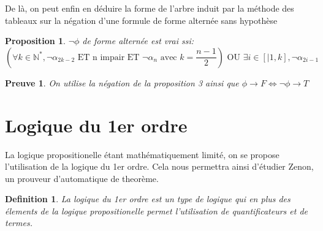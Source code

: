 \documentclass{paper}
\newtheorem{prop}{Proposition}
\newtheorem{defi}{Definition}
\newtheorem{preuve}{Preuve}
\begin{document}
De là, on peut enfin en déduire la forme de l'arbre induit par la méthode des tableaux sur la négation d'une formule de forme alternée sans hypothèse


\begin{prop}
    $\lnot\phi$ de forme alternée est vrai ssi:
    $$(\forall k\in\mathbb{N}^*, \lnot\alpha_{2k-2} \text{ ET n impair ET } \lnot\alpha_n \text{ avec } k=\frac{n-1}{2}) \text{ OU } \exists i\in [|1,k], \lnot\alpha_{2i-1}$$
\end{prop}

\begin{preuve}
    On utilise la négation de la proposition 3 ainsi que $\phi \rightarrow F \Leftrightarrow \lnot\phi \rightarrow T$  
\end{preuve}



























\section{Logique du 1er ordre}
La logique propositionelle étant mathématiquement limité, on se propose l'utilisation de la logique du 1er ordre.
Cela nous permettra ainsi d'étudier Zenon, un prouveur d'automatique de theorème.
\begin{defi}
    La \textit{logique du 1er ordre} est un type de logique qui en plus des élements de la logique propositionelle permet l'utilisation de
    quantificateurs et de \textit{termes}.
\end{defi}
\end{document}
